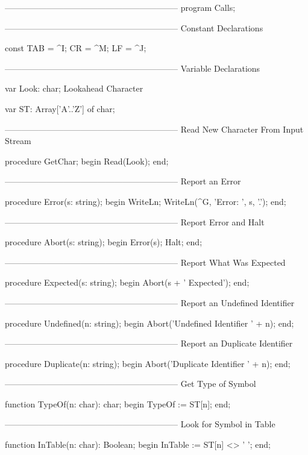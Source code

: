 \documentclass[float=false, crop=false]{standalone}
\begin{document}
\begin{code}
{--------------------------------------------------------------}
program Calls;

{--------------------------------------------------------------}
{ Constant Declarations }

const TAB = ^I;
      CR  = ^M;
      LF  = ^J;

{--------------------------------------------------------------}
{ Variable Declarations }

var Look: char;              { Lookahead Character }

var ST: Array['A'..'Z'] of char;


{--------------------------------------------------------------}
{ Read New Character From Input Stream }

procedure GetChar;
begin
   Read(Look);
end;

{--------------------------------------------------------------}
{ Report an Error }

procedure Error(s: string);
begin
   WriteLn;
   WriteLn(^G, 'Error: ', s, '.');
end;


{--------------------------------------------------------------}
{ Report Error and Halt }

procedure Abort(s: string);
begin
   Error(s);
   Halt;
end;


{--------------------------------------------------------------}
{ Report What Was Expected }

procedure Expected(s: string);
begin
   Abort(s + ' Expected');
end;


{--------------------------------------------------------------}
{ Report an Undefined Identifier }

procedure Undefined(n: string);
begin
   Abort('Undefined Identifier ' + n);
end;


{--------------------------------------------------------------}
{ Report an Duplicate Identifier }

procedure Duplicate(n: string);
begin
     Abort('Duplicate Identifier ' + n);
end;


{--------------------------------------------------------------}
{ Get Type of Symbol }

function TypeOf(n: char): char;
begin
     TypeOf := ST[n];
end;


{--------------------------------------------------------------}
{ Look for Symbol in Table }

function InTable(n: char): Boolean;
begin
   InTable := ST[n] <> ' ';
end;



\end{code}
\end{document}
